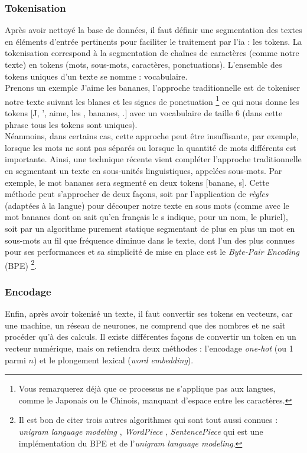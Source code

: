 \documentclass[12pt, twoside]{report}
\begin{document}
\subsubsection{Tokenisation}
Après avoir nettoyé la base de données, il faut définir une segmentation des textes en éléments d'entrée pertinents pour faciliter le traitement par l'\Gls{ia} : les \glspl{token}. La tokenisation correspond à la segmentation de chaînes de caractères (comme notre texte) en tokens (mots, sous-mots, caractères, ponctuations). L'ensemble des tokens uniques d'un texte se nomme : vocabulaire.\\
\indent Prenons un exemple \og J'aime les bananes\fg, l'approche traditionnelle est de tokeniser notre texte suivant les blancs et les signes de ponctuation \footnote{Vous remarquerez déjà que ce processus ne s'applique pas aux langues, comme le Japonais ou le Chinois, manquant d'espace entre les caractères.} ce qui nous donne les tokens [\og J\fg, \og '\fg, \og aime\fg, \og les \fg, \og bananes\fg, \og .\fg] avec un vocabulaire de taille 6 (dans cette phrase tous les tokens sont uniques).\\
\indent Néanmoins, dans certains cas, cette approche peut être insuffisante, par exemple, lorsque les mots ne sont pas séparés ou lorsque la quantité de mots différents est importante. Ainsi, une technique récente vient compléter l'approche traditionnelle en segmentant un texte en sous-unités linguistiques, appelées sous-mots. Par exemple, le mot \og bananes\fg{} sera segmenté en deux tokens [\og banane\fg, \og s\fg]. Cette méthode peut s'approcher de deux façons, soit par l'application de \textit{règles} (adaptées à la langue) pour découper notre texte en sous mots (comme avec le mot \og bananes\fg{} dont on sait qu'en français le \og s\fg{} indique, pour un nom, le pluriel), soit par un algorithme purement statique segmentant de plus en plus un mot en sous-mots au fil que fréquence diminue dans le texte, dont l'un des plus connues pour ses performances et sa simplicité de mise en place est le \textit{Byte-Pair Encoding} (BPE) \autocite{bpe}\footnote{Il est bon de citer trois autres algorithmes qui sont tout aussi connues : \textit{unigram language modeling} \autocite{unigramkudo2018}, \textit{WordPiece}  \autocite{wordpiece}, \textit{SentencePiece} \autocite{sentencepiece} qui est une implémentation du BPE et de l'\textit{unigram language modeling}.}.

\subsubsection{Encodage}
Enfin, après avoir tokenisé un texte, il faut convertir ses tokens en vecteurs, car une machine, un réseau de neurones, ne comprend que des nombres et ne sait procéder qu'à des calculs. Il existe différentes façons de convertir un \gls{token} en un vecteur numérique, mais on retiendra deux méthodes : l'encodage \textit{one-hot} (ou 1 parmi $n$) et le plongement lexical (\textit{word embedding}).\\
\end{document}
